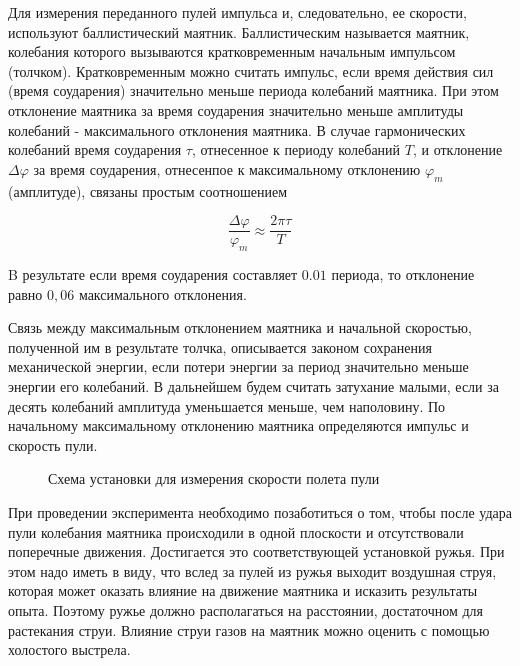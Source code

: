 \documentclass[14pt]{article}
\begin{document}
Для измерения переданного пулей импульса и, следовательно, ее скорости, используют баллистический маятник. Баллистическим называется маятник, колебания которого вызываются кратковременным начальным импульсом (толчком). Кратковременным можно считать импульс, если время действия сил (время соударения) значительно меньше периода колебаний маятника. При этом отклонение маятника за время соударения значительно меньше амплитуды колебаний - максимального отклонения маятника. В случае гармонических колебаний время соударения $\tau$, отнесенное к периоду колебаний $T$, и отклонение $\Delta\varphi$ за время соударения, отнесенпое к максимальному отклонению $\varphi_m$(амплитуде), связаны простым соотношением

$$
	\frac{\Delta\varphi}{\varphi_m} \approx \frac{2\pi\tau}{T}
$$

\noindent B результате если время соударения составляет $0.01$ периода, то отклонение равно $0,06$ максимального отклонения. 

Связь между максимальным отклонением маятника и начальной скоростью, полученной им в результате толчка, описывается законом сохранения механической энергии, если потери энергии за период значительно меньше энергии его колебаний. В дальнейшем будем считать затухание малыми, если за десять колебаний амплитуда уменьшается меньше, чем наполовину. По начальному максимальному отклонению маятника определяются импульс и скорость пули.

\begin{figure}[h!]
	\caption{Схема установки для измерения скорости полета пули}
\end{figure} 

При проведении эксперимента необходимо позаботиться о том, чтобы после удара пули колебания маятника происходили в одной плоскости и отсутствовали поперечные движения. Достигается это соответствующей установкой ружья. При этом надо иметь в виду, что вслед за пулей из ружья выходит воздушная струя, которая может оказать влияние на движение маятника и исказить результаты опыта. Поэтому ружье должно располагаться на расстоянии, достаточном для растекания струи. Влияние струи газов на маятник можно оценить с помощью холостого выстрела.
\end{document}
